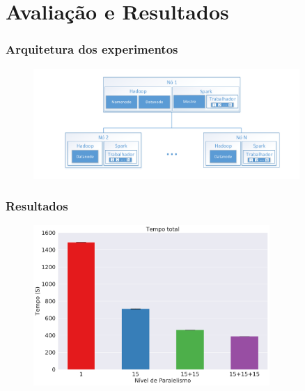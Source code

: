 \documentclass{beamer}
\begin{document}
\section{Avaliação e Resultados}
\begin{frame}
 \frametitle{Arquitetura dos experimentos}
  \begin{figure}[ht]
  \centerline{
  \includegraphics[width=0.9\textwidth]{./img/experiments_arch.pdf}}
  \label{fig:experiment_arch}
  \end{figure}
\end{frame}

\begin{frame}
 \frametitle{Resultados}
 \begin{figure}[ht]
  \centerline{
  \includegraphics[width=0.8\textwidth]{./img/total.pdf}}
  \label{fig:total_full}
  \end{figure}
\end{frame}
\end{document}

